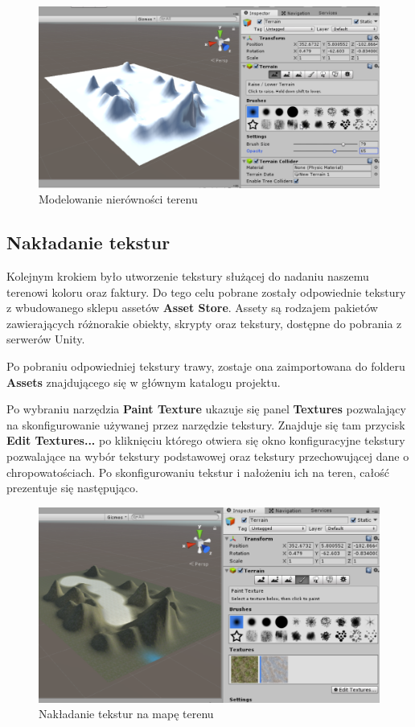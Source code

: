 \documentclass[openright]{xmgr}
\newcommand{\name}[1]{\textbf{\textcolor{NavyBlue}{#1}}}
\begin{document}
        \begin{figure}[H]
        \includegraphics[width=\textwidth]{teren_2.png}
        \caption{Modelowanie nierówności terenu}
        \end{figure}

    \subsection{Nakładanie tekstur}

        Kolejnym krokiem było utworzenie tekstury służącej do nadaniu naszemu terenowi koloru oraz faktury. Do tego celu pobrane zostały odpowiednie tekstury z wbudowanego sklepu assetów \name{Asset Store}. Assety są rodzajem pakietów zawierających różnorakie obiekty, skrypty oraz tekstury, dostępne do pobrania z serwerów Unity.

        Po pobraniu odpowiedniej tekstury trawy, zostaje ona zaimportowana do folderu \name{Assets} znajdującego się w głównym katalogu projektu.

        Po wybraniu narzędzia \name{Paint Texture} ukazuje się panel \name{Textures} pozwalający na skonfigurowanie używanej przez narzędzie tekstury. Znajduje się tam przycisk \name{Edit Textures...} po kliknięciu którego otwiera się okno konfiguracyjne tekstury pozwalające na wybór tekstury podstawowej oraz tekstury przechowującej dane o chropowatościach. Po skonfigurowaniu tekstur i nałożeniu ich na teren, całość prezentuje się następująco.

        \begin{figure}[H]
        \includegraphics[width=\textwidth]{teren_3.png}
        \caption{Nakładanie tekstur na mapę terenu}
        \end{figure}
\end{document}
